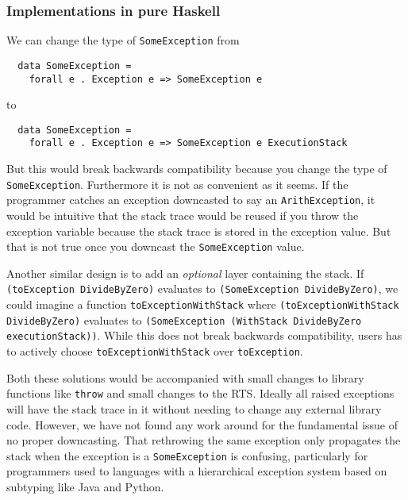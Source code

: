 \subsubsection{Implementations in pure Haskell}

We can change the type of \texttt{SomeException} from

\begin{verbatim}
  data SomeException =
    forall e . Exception e => SomeException e
\end{verbatim}

to

\begin{verbatim}
  data SomeException =
    forall e . Exception e => SomeException e ExecutionStack
\end{verbatim}

But this would break backwards compatibility because you change the type
of \texttt{SomeException}. Furthermore it is not as convenient as it
seems. If the programmer catches an exception downcasted to say an
\texttt{ArithException}, it would be intuitive that the stack trace
would be reused if you throw the exception variable because the stack
trace is stored in the exception value. But that is not true once you
downcast the \texttt{SomeException} value.

Another similar design is to add an \emph{optional} layer containing
the stack. If \texttt{(toException DivideByZero)} evaluates to
\texttt{(SomeException DivideByZero)}, we could imagine a function
\texttt{toExceptionWithStack} where \texttt{(toExceptionWithStack
DivideByZero)} evaluates to \texttt{(SomeException (WithStack
DivideByZero executionStack))}. While this does not break backwards
compatibility, users has to actively choose
\texttt{toExceptionWithStack} over \texttt{toException}.

Both these solutions would be accompanied with small changes to library
functions like \texttt{throw} and small changes to the RTS. Ideally all
raised exceptions will have the stack trace in it without needing to
change any external library code. However, we have not found any work around
for the fundamental issue of no proper downcasting. That rethrowing the same
exception only propagates the stack when the exception is a \texttt{SomeException}
is confusing, particularly for programmers used to languages with a
hierarchical exception system based on subtyping like Java and Python.

